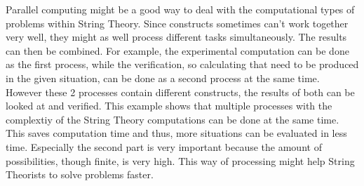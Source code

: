 \documentclass[../paper.tex]{subfiles}
\begin{document}
Parallel computing might be a good way to deal with the computational types of problems within String Theory. Since constructs sometimes can't work together very well, they might as well process different tasks simultaneously. The results can then be combined. For example, the experimental computation can be done as the first process, while the verification, so calculating that need to be produced in the given situation, can be done as a second process at the same time. However these 2 processes contain different constructs, the results of both can be looked at and verified. This example shows that multiple processes with the complextiy of the String Theory computations can be done at the same time. This saves computation time and thus, more situations can be evaluated in less time. Especially the second part is very important because the amount of possibilities, though finite, is very high. This way of processing might help String Theorists to solve problems faster.
\end{document}
